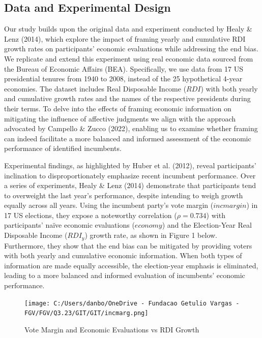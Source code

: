 \documentclass[
]{article}
\begin{document}
\hypertarget{data-and-experimental-design}{%
\subsection{Data and Experimental
Design}\label{data-and-experimental-design}}

Our study builds upon the original data and experiment conducted by
Healy \& Lenz (2014), which explore the impact of framing yearly and
cumulative RDI growth rates on participants' economic evaluations while
addressing the end bias. We replicate and extend this experiment using
real economic data sourced from the Bureau of Economic Affairs (BEA).
Specifically, we use data from 17 US presidential tenures from 1940 to
2008, instead of the 25 hypothetical 4-year economies. The dataset
includes Real Disposable Income (\(RDI\)) with both yearly and
cumulative growth rates and the names of the respective presidents
during their terms. To delve into the effects of framing economic
information on mitigating the influence of affective judgments we align
with the approach advocated by Campello \& Zucco (2022), enabling us to
examine whether framing can indeed facilitate a more balanced and
informed assessment of the economic performance of identified
incumbents.

Experimental findings, as highlighted by Huber et al. (2012), reveal
participants' inclination to disproportionately emphasize recent
incumbent performance. Over a series of experiments, Healy \& Lenz
(2014) demonstrate that participants tend to overweight the last year's
performance, despite intending to weigh growth equally across all years.
Using the incumbent party's vote margin (\(incmargin\)) in 17 US
elections, they expose a noteworthy correlation (\(\rho = 0.734\)) with
participants' naïve economic evaluations (\(economy\)) and the
Election-Year Real Disposable Income (\(RDI_y\)) growth rate, as shown
in Figure 1 below. Furthermore, they show that the end bias can be
mitigated by providing voters with both yearly and cumulative economic
information. When both types of information are made equally accessible,
the election-year emphasis is eliminated, leading to a more balanced and
informed evaluation of incumbents' economic performance.

\begin{figure}
\hypertarget{fig:label}{%
\centering
\texttt{[image: C:/Users/danbo/OneDrive - Fundacao Getulio Vargas - FGV/FGV/Q3.23/GIT/GIT/incmarg.png]}
\caption{Vote Margin and Economic Evaluations vs RDI
Growth}\label{fig:label}
}
\end{figure}
\end{document}
